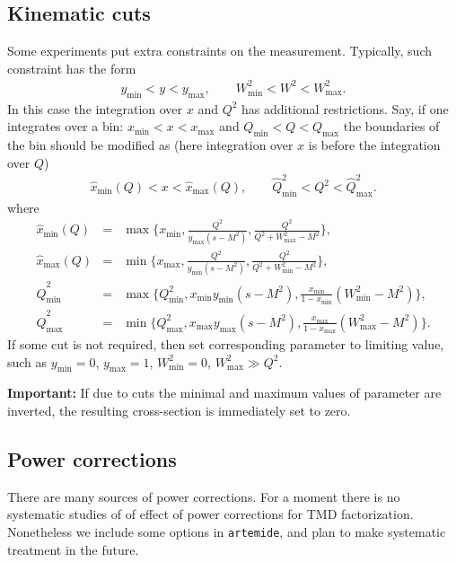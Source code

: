 \documentclass[prd,nofootinbib,eqsecnum,final]{revtex4}
\renewcommand{\(}{\left(}
\renewcommand{\)}{\right)}
\renewcommand{\[}{\left[}
\renewcommand{\]}{\right]}
\begin{document}
\subsection{Kinematic cuts}
\label{TMDXs:cuts}

Some experiments put extra constraints on the measurement. Typically, such constraint has the form
\begin{eqnarray}
y_{\min}<y<y_{\max},\qquad W^2_{\min}<W^2<W_{\max}^2.
\end{eqnarray}
In this case the integration over $x$ and $Q^2$ has additional restrictions. Say, if one integrates over a bin: $x_{\min}<x<x_{\max}$ and $Q_{\min}<Q<Q_{\max}$ the boundaries of the bin should be modified as (here integration over $x$ is before the integration over $Q$)
\begin{eqnarray}
\hat x_{\text{min}}(Q)<x<\hat x_{\text{max}}(Q),
\qquad
\hat Q^2_{\text{min}}<Q^2<\hat Q^2_{\text{max}}.
\end{eqnarray}
where
\begin{eqnarray*}
\hat x_{\text{min}}(Q)&=&\max\{x_{\text{min}},\frac{Q^2}{y_{\text{max}}(s-M^2)},\frac{Q^2}{Q^2+W^2_{\text{max}}-M^2}\},
\\
\hat x_{\text{max}}(Q)&=&\min\{x_{\text{max}},\frac{Q^2}{y_{\text{min}}(s-M^2)},\frac{Q^2}{Q^2+W^2_{\text{min}}-M^2}\},
\\
\hat Q^2_{\text{min}}&=&\max\{Q^2_{\text{min}},x_{\text{min}}y_{\text{min}}(s-M^2),\frac{x_{\text{min}}}{1-x_{\text{min}}}(W^2_{\text{min}}-M^2)\},
\\
\hat Q^2_{\text{max}}&=&\min\{Q^2_{\text{max}},x_{\text{max}}y_{\text{max}}(s-M^2),\frac{x_{\text{max}}}{1-x_{\text{max}}}(W^2_{\text{max}}-M^2)\}.
\end{eqnarray*}
If some cut is not required, then set corresponding parameter to limiting value, such as $y_{\min}=0$, $y_{\max}=1$, $W^2_{\min}=0$, $W^2_{\max}\gg Q^2$.

\textbf{Important:} If due to cuts the minimal and maximum values of parameter are inverted, the resulting cross-section is immediately set to zero.

\subsection{Power corrections}

There are many sources of power corrections. For a moment there is no systematic studies of of effect of power corrections for TMD factorization. Nonetheless we include some options in \texttt{artemide}, and plan to make systematic treatment in the future.
\end{document}

